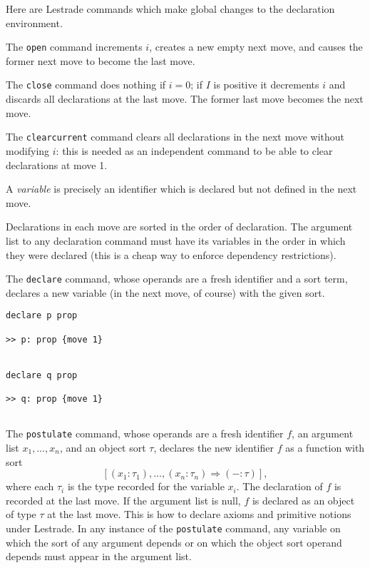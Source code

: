 \documentclass[12pt]{slides}
\begin{document}
\begin{slide}

Here are Lestrade commands which make global changes to the declaration environment.

The {\tt open} command increments $i$, creates a new empty next move, and causes the former next move to become the last move.

The {\tt close} command does  nothing if $i=0$; if $I$ is positive it decrements $i$ and discards all declarations at the last move.
The former last move becomes the next move.

The {\tt clearcurrent} command clears all declarations in the next move without modifying $i$:  this is needed as an independent command to be able to clear declarations at move 1.


\end{slide}

\begin{slide}

A {\em variable} is precisely an identifier which is declared but not defined in the next move.

Declarations in each move are sorted in the order of declaration.  The argument list to any declaration command must have its variables in the order in which they were declared (this is a cheap way to enforce dependency restrictions).

The {\tt declare} command, whose operands are a fresh identifier and a sort term, declares a new variable (in the next move, of course) with the given sort.

\end{slide}

\begin{slide}
\begin{verbatim}
declare p prop

>> p: prop {move 1}


declare q prop

>> q: prop {move 1}


\end{verbatim}

\end{slide}

\begin{slide}

The {\tt postulate} command, whose operands are a fresh identifier $f$, an argument list $x_1,\ldots,x_n$, and an object sort $\tau$, declares the new identifier $f$ as a function with sort $$[(x_1:\tau_1),\ldots,(x_n:\tau_n)\Rightarrow (-:\tau)],$$ where each $\tau_i$ is the type recorded for the variable $x_i$.
The declaration of $f$ is recorded at the last move.  If the argument list is null, $f$ is declared as an object of type $\tau$ at the last move.  This is how to declare axioms and primitive notions under Lestrade.  In any instance of the {\tt postulate} command, any variable on which the sort of any argument depends or on which the object sort operand depends must appear in the argument list.

\end{slide}
\end{document}
